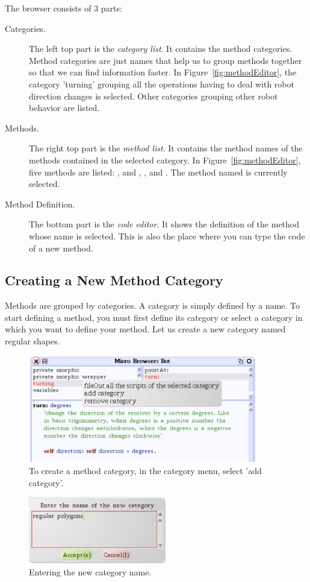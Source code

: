 The browser consists of 3 parts:
\begin{description}
\item[Categories.] The left top part is the \emph{category list}.
It contains the method categories. Method categories are just names
that help us to group methods together so that we can find information
faster. In Figure~\ref{fig:methodEditor}, the category 'turning'
grouping all the operations having to deal with robot direction
changes is selected. Other categories grouping other robot behavior are listed.

\item[Methods.] The right top part is the \emph{method list}.
It contains the method names of the methods contained in the selected category. In Figure~\ref{fig:methodEditor}, five  methods are listed: ,  and \turnLeft, \turnRight, and . The method named  is currently selected.

\item[Method Definition.] The bottom part is the \emph{code editor}. It shows the definition of the method whose name is selected. This is also the place where you can type the code of a new method.
\end{description}


\subsection{Creating a New Method Category}\label{sec:createCategory} 
Methods are grouped by categories. A category is simply defined by a name. To start defining a method, you must first define its category or select a category in which you want to define your method. Let us create a new category named regular shapes.

\begin{figure}
\centerline{\includegraphics[width=10cm]{tbTwo}} 
\caption{To create a method category, in the category menu, select 'add category'.\label{fig:categoryMenu}}
\end{figure}
\begin{figure}\label{fig:categoryPrompt}
\centerline{\includegraphics[width=6cm]{tbThree}}
 \caption{Entering the new category name.}
\end{figure}

